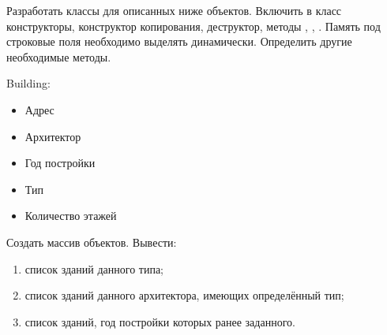 
Разработать классы для описанных ниже объектов. Включить в класс
конструкторы, конструктор копирования, деструктор, методы ,
, . Память под строковые поля необходимо выделять
динамически. Определить другие необходимые методы.

Building:
\begin{itemize}
	\item Адрес
	\item Архитектор
	\item Год постройки
	\item Тип
	\item Количество этажей
\end{itemize}

Создать массив объектов. Вывести:
\begin{enumerate}
	\item список зданий данного типа;
	\item список зданий данного архитектора, имеющих определённый тип;
	\item список зданий, год постройки которых ранее заданного.
\end{enumerate}
